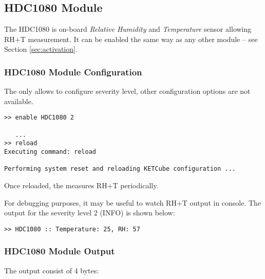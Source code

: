 \clearpage
\subsection{HDC1080 Module}

The HDC1080 is on-board {\it Relative Humidity} and {\it Temperature} sensor allowing RH+T measurement. It can be enabled the same way as any other module -- see Section \ref{sec:activation}.

\subsubsection{HDC1080 Module Configuration}
  The  only allows to configure severity level, other configuration options are not available.
  
\begin{docCodeExample}
\begin{verbatim}
>> enable HDC1080 2

   ...
>> reload
Executing command: reload

Performing system reset and reloading KETCube configuration ...  
\end{verbatim}
\end{docCodeExample}
  
  Once reloaded, the  measures RH+T periodically. 
  
  For debugging purposes, it may be useful to watch RH+T output in console. The output for the severity level 2 (INFO) is shown below:

\begin{docCodeExample}
\begin{verbatim}
>> HDC1080 :: Temperature: 25, RH: 57
\end{verbatim}
\end{docCodeExample}

\subsubsection{HDC1080 Module Output}
  The  output consist of 4 bytes:
  

